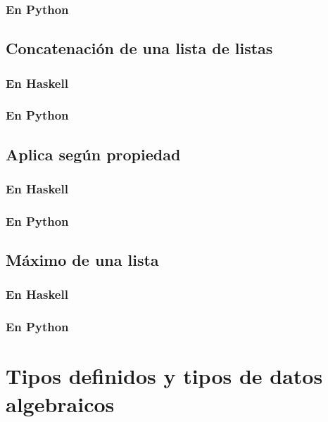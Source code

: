 \documentclass[a4paper,12pt,twoside]{book}
\begin{document}
\subsection*{En Python}

\section{Concatenación de una lista de listas}
\subsection*{En Haskell}
\subsection*{En Python}

\section{Aplica según propiedad}
\subsection*{En Haskell}
\subsection*{En Python}

\section{Máximo de una lista}
\subsection*{En Haskell}
\subsection*{En Python}

\chapter{Tipos definidos y tipos de datos algebraicos}
\end{document}
